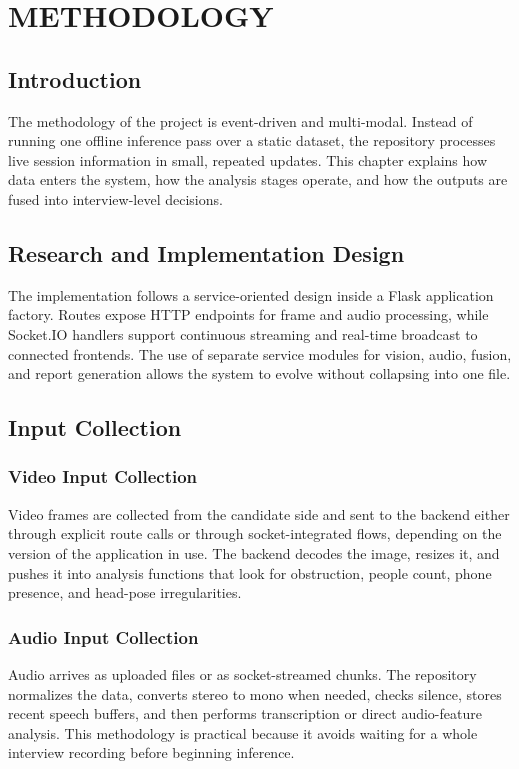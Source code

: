 \documentclass[12pt,a4paper]{extreport}
\begin{document}
\chapter{METHODOLOGY}
\section{Introduction}
The methodology of the project is event-driven and multi-modal. Instead of running one offline inference pass over a static dataset, the repository processes live session information in small, repeated updates. This chapter explains how data enters the system, how the analysis stages operate, and how the outputs are fused into interview-level decisions.

\section{Research and Implementation Design}
The implementation follows a service-oriented design inside a Flask application factory. Routes expose HTTP endpoints for frame and audio processing, while Socket.IO handlers support continuous streaming and real-time broadcast to connected frontends. The use of separate service modules for vision, audio, fusion, and report generation allows the system to evolve without collapsing into one file.

\section{Input Collection}
\subsection{Video Input Collection}
Video frames are collected from the candidate side and sent to the backend either through explicit route calls or through socket-integrated flows, depending on the version of the application in use. The backend decodes the image, resizes it, and pushes it into analysis functions that look for obstruction, people count, phone presence, and head-pose irregularities.

\subsection{Audio Input Collection}
Audio arrives as uploaded files or as socket-streamed chunks. The repository normalizes the data, converts stereo to mono when needed, checks silence, stores recent speech buffers, and then performs transcription or direct audio-feature analysis. This methodology is practical because it avoids waiting for a whole interview recording before beginning inference.
\end{document}
